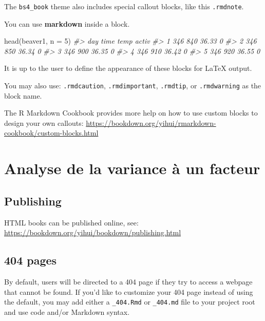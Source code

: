 \documentclass[
]{book}
\newenvironment{Shaded}{\begin{snugshade}}{\end{snugshade}}
\newcommand{\AttributeTok}[1]{\textcolor[rgb]{0.77,0.63,0.00}{#1}}
\newcommand{\CommentTok}[1]{\textcolor[rgb]{0.56,0.35,0.01}{\textit{#1}}}
\newcommand{\DecValTok}[1]{\textcolor[rgb]{0.00,0.00,0.81}{#1}}
\newcommand{\FunctionTok}[1]{\textcolor[rgb]{0.00,0.00,0.00}{#1}}
\newcommand{\NormalTok}[1]{#1}
\theoremstyle{definition}
\theoremstyle{definition}
\theoremstyle{definition}
\theoremstyle{definition}
\theoremstyle{remark}
\begin{document}
The \texttt{bs4\_book} theme also includes special callout blocks, like this \texttt{.rmdnote}.

You can use \textbf{markdown} inside a block.

\begin{Shaded}
\begin{Highlighting}[]
\FunctionTok{head}\NormalTok{(beaver1, }\AttributeTok{n =} \DecValTok{5}\NormalTok{)}
\CommentTok{\#\textgreater{}   day time  temp activ}
\CommentTok{\#\textgreater{} 1 346  840 36.33     0}
\CommentTok{\#\textgreater{} 2 346  850 36.34     0}
\CommentTok{\#\textgreater{} 3 346  900 36.35     0}
\CommentTok{\#\textgreater{} 4 346  910 36.42     0}
\CommentTok{\#\textgreater{} 5 346  920 36.55     0}
\end{Highlighting}
\end{Shaded}

It is up to the user to define the appearance of these blocks for LaTeX output.

You may also use: \texttt{.rmdcaution}, \texttt{.rmdimportant}, \texttt{.rmdtip}, or \texttt{.rmdwarning} as the block name.

The R Markdown Cookbook provides more help on how to use custom blocks to design your own callouts: \url{https://bookdown.org/yihui/rmarkdown-cookbook/custom-blocks.html}

\hypertarget{anova1}{%
\chapter{Analyse de la variance à un facteur}\label{anova1}}

\hypertarget{publishing}{%
\section{Publishing}\label{publishing}}

HTML books can be published online, see: \url{https://bookdown.org/yihui/bookdown/publishing.html}

\hypertarget{pages}{%
\section{404 pages}\label{pages}}

By default, users will be directed to a 404 page if they try to access a webpage that cannot be found. If you'd like to customize your 404 page instead of using the default, you may add either a \texttt{\_404.Rmd} or \texttt{\_404.md} file to your project root and use code and/or Markdown syntax.
\end{document}
